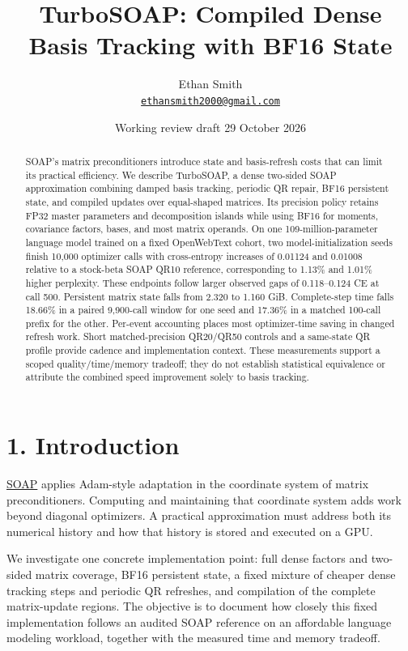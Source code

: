 \documentclass[
  10pt,
]{article}
\title{TurboSOAP: Compiled Dense Basis Tracking with BF16 State}
\author{Ethan Smith\\{\small \href{mailto:ethansmith2000@gmail.com}{\nolinkurl{ethansmith2000@gmail.com}}}}
\date{Working review draft \textbar{} 29 October 2026}
\begin{document}
\maketitle
\begin{abstract}
SOAP's matrix preconditioners introduce state and basis-refresh costs
that can limit its practical efficiency. We describe TurboSOAP, a dense
two-sided SOAP approximation combining damped basis tracking, periodic
QR repair, BF16 persistent state, and compiled updates over equal-shaped
matrices. Its precision policy retains FP32 master parameters and
decomposition islands while using BF16 for moments, covariance factors,
bases, and most matrix operands. On one 109-million-parameter language
model trained on a fixed OpenWebText cohort, two model-initialization
seeds finish 10,000 optimizer calls with cross-entropy increases of
0.01124 and 0.01008 relative to a stock-beta SOAP QR10 reference,
corresponding to 1.13\% and 1.01\% higher perplexity. These endpoints
follow larger observed gaps of 0.118--0.124 CE at call 500. Persistent
matrix state falls from 2.320 to 1.160 GiB. Complete-step time falls
18.66\% in a paired 9,900-call window for one seed and 17.36\% in a
matched 100-call prefix for the other. Per-event accounting places most
optimizer-time saving in changed refresh work. Short matched-precision
QR20/QR50 controls and a same-state QR profile provide cadence and
implementation context. These measurements support a scoped
quality/time/memory tradeoff; they do not establish statistical
equivalence or attribute the combined speed improvement solely to basis
tracking.
\end{abstract}

\hypertarget{introduction}{%
\section{1. Introduction}\label{introduction}}

\href{https://arxiv.org/abs/2409.11321v2}{SOAP} applies Adam-style
adaptation in the coordinate system of matrix preconditioners. Computing
and maintaining that coordinate system adds work beyond diagonal
optimizers. A practical approximation must address both its numerical
history and how that history is stored and executed on a GPU.

We investigate one concrete implementation point: full dense factors and
two-sided matrix coverage, BF16 persistent state, a fixed mixture of
cheaper dense tracking steps and periodic QR refreshes, and compilation
of the complete matrix-update regions. The objective is to document how
closely this fixed implementation follows an audited SOAP reference on
an affordable language modeling workload, together with the measured
time and memory tradeoff.
\end{document}
